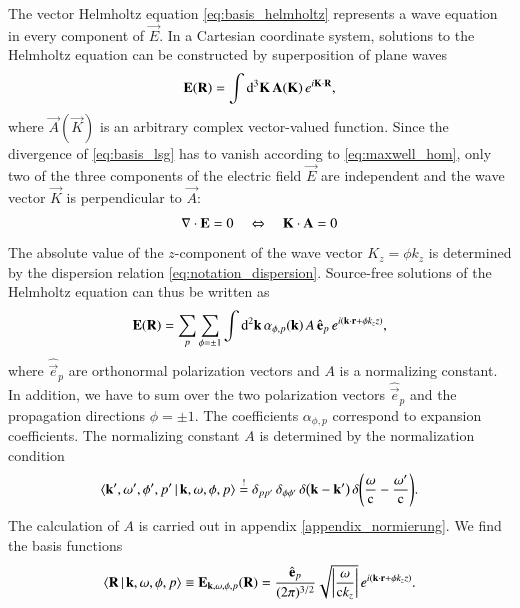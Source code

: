 The vector Helmholtz equation \eqref{eq:basis_helmholtz} represents a wave
equation in every component of $\vec E$. In a Cartesian coordinate system,
solutions to the Helmholtz equation can be constructed by superposition of
plane waves
\begin{equation}
\label{eq:basis_lsg}
{\mathbf{E}}({\mathbf{R}}) = \int \mathrm{d}^3{\mathbf{K}} \, {\mathbf{A}}({\mathbf{K}}) \, e^{i{\mathbf{K}} \cdot {\mathbf{R}}},
\end{equation}
where $\vec{A}(\vec K)$ is an arbitrary complex vector-valued function.
Since the divergence of \eqref{eq:basis_lsg} has to vanish according to \eqref{eq:maxwell_hom}, only two
of the three components of the electric field $\vec E$ are independent
and the wave vector $\vec K$ is perpendicular to $\vec A$:
\begin{equation}
\label{eq:basis_k}
{\mathbf{\nabla}} \cdot {\mathbf{E}} = 0 \quad\Leftrightarrow\quad {\mathbf{K}} \cdot {\mathbf{A}} = 0
\end{equation}
The absolute value of the $z$-component of the wave vector $K_z=\phi k_z$ is
determined by the dispersion relation \eqref{eq:notation_dispersion}.
Source-free solutions of the Helmholtz equation can thus be written as
\begin{equation}
{\mathbf{E}}({\mathbf{R}}) = \sum_p \sum_{\phi=\pm1} \int \mathrm{d}^2{\mathbf{k}} \, \alpha_{\phi,p}({\mathbf{k}}) \, A \, \hat{{\mathbf{e}}}_p \, e^{i({\mathbf{k}} \cdot {\mathbf{r}} + \phi k_z z)},
\end{equation}
where $\hat{\vec e}_p$ are orthonormal polarization vectors and $A$ is a
normalizing constant. In addition, we have to sum over the two polarization
vectors $\hat{\vec e}_p$ and the propagation directions $\phi=\pm1$. The
coefficients $\alpha_{\phi,p}$ correspond to expansion coefficients. The
normalizing constant $A$ is determined by the normalization condition
\begin{equation}
\label{eq:basis_norm}
\braket{{\mathbf{k}}^\prime, \omega^\prime, \phi^\prime, p^\prime \, | \, {\mathbf{k}}, \omega, \phi, p} 
\stackrel{!}{=} \delta_{p p^\prime} \, \delta_{\phi \phi^\prime}\, \delta{\left({\mathbf{k}} - {\mathbf{k}}^\prime\right)} \, \delta{\left(\frac{\omega}{\mathrm{c}} - \frac{\omega^\prime}{\mathrm{c}}\right)}.
\end{equation}
The calculation of $A$ is carried out in appendix \ref{appendix_normierung}. We
find the basis functions
\begin{equation}
\label{eq:basis_grund}
\braket{{\mathbf{R}} \, | \, {\mathbf{k}}, \omega, \phi, p} \equiv {\mathbf{E}}_{{\mathbf{k}},\omega,\phi,p}({\mathbf{R}}) = \frac{\hat{{\mathbf{e}}}_p}{(2\pi)^{3/2}} \sqrt{\left|\frac{\omega}{\mathrm{c} k_z}\right|} \, e^{i({\mathbf{k}} \cdot {\mathbf{r}} + \phi k_z z)}.
\end{equation}

